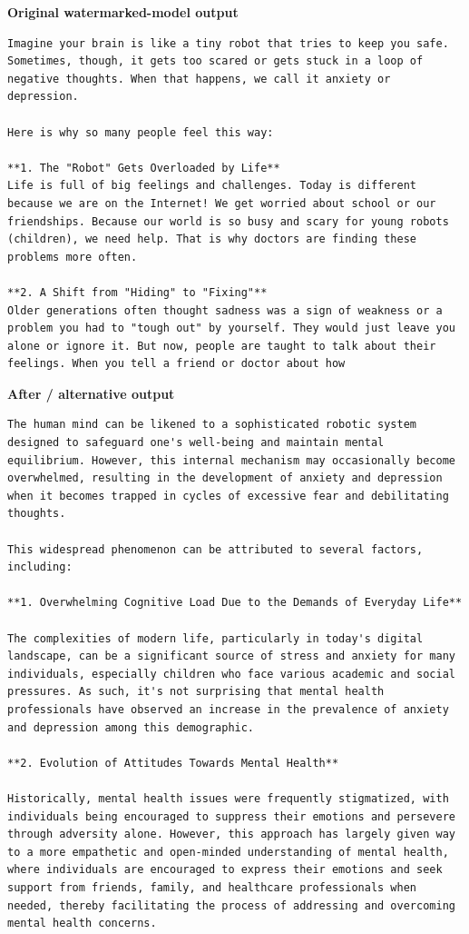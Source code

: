 \textbf{Original watermarked-model output}

\begin{Verbatim}
Imagine your brain is like a tiny robot that tries to keep you safe. Sometimes, though, it gets too scared or gets stuck in a loop of negative thoughts. When that happens, we call it anxiety or depression.

Here is why so many people feel this way:

**1. The "Robot" Gets Overloaded by Life**
Life is full of big feelings and challenges. Today is different because we are on the Internet! We get worried about school or our friendships. Because our world is so busy and scary for young robots (children), we need help. That is why doctors are finding these problems more often.

**2. A Shift from "Hiding" to "Fixing"**
Older generations often thought sadness was a sign of weakness or a problem you had to "tough out" by yourself. They would just leave you alone or ignore it. But now, people are taught to talk about their feelings. When you tell a friend or doctor about how
\end{Verbatim}

\textbf{After / alternative output}

\begin{Verbatim}
The human mind can be likened to a sophisticated robotic system designed to safeguard one's well-being and maintain mental equilibrium. However, this internal mechanism may occasionally become overwhelmed, resulting in the development of anxiety and depression when it becomes trapped in cycles of excessive fear and debilitating thoughts.

This widespread phenomenon can be attributed to several factors, including:

**1. Overwhelming Cognitive Load Due to the Demands of Everyday Life**

The complexities of modern life, particularly in today's digital landscape, can be a significant source of stress and anxiety for many individuals, especially children who face various academic and social pressures. As such, it's not surprising that mental health professionals have observed an increase in the prevalence of anxiety and depression among this demographic.

**2. Evolution of Attitudes Towards Mental Health**

Historically, mental health issues were frequently stigmatized, with individuals being encouraged to suppress their emotions and persevere through adversity alone. However, this approach has largely given way to a more empathetic and open-minded understanding of mental health, where individuals are encouraged to express their emotions and seek support from friends, family, and healthcare professionals when needed, thereby facilitating the process of addressing and overcoming mental health concerns.
\end{Verbatim}

